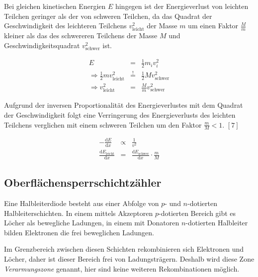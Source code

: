 \documentclass[12pt,a4paper]{scrartcl}
\numberwithin{equation}{section} %
\renewcommand{\[}{} %
\renewcommand{\]}{\noindent} %
\begin{document}
Bei gleichen kinetischen Energien \(E\) hingegen ist der Energieverlust
von leichten Teilchen geringer als der von schweren Teilchen, da das
Quadrat der Geschwindigkeit des leichteren Teilchens
\(v_\mathrm{leicht}^2\) der Masse \(m\) um einen Faktor \(\frac{M}{m}\)
kleiner als das des schwereren Teilchens der Masse \(M\) und
Geschwindigkeitsquadrat \(v_\mathrm{schwer}^2\) ist.

\[
\begin{eqnarray}
    E &=& \frac{1}{2}m_i v_i^2 \\
    \Rightarrow \frac{1}{2} m v_\mathrm{leicht}^2
        &\overset{!}{=}& \frac{1}{2} M v_\mathrm{schwer}^2 \\
    \Rightarrow v_\mathrm{leicht}^2 & = &\frac{M}{m} v_\mathrm{schwer}^2
\end{eqnarray}
\]

Aufgrund der inversen Proportionalität des Energieverlustes mit dem
Quadrat der Geschwindigkeit folgt eine Verringerung des Energieverlusts
des leichten Teilchens verglichen mit einem schweren Teilchen um den
Faktor \(\frac{m}{M} < 1\). \([7]\)

\[
\begin{eqnarray}
    - \frac{\mathrm dE}{\mathrm dx} &\propto& \frac{1}{v^2} \\
    \frac{\mathrm dE_\mathrm{leicht}}{\mathrm dx}
        &=& \frac{\mathrm dE_\mathrm{schwer}}{\mathrm dx}
            \cdot \frac{m}{M}
\end{eqnarray}
\]

\hypertarget{oberfluxe4chensperrschichtzuxe4hler}{%
\subsection{Oberflächensperrschichtzähler}\label{oberfluxe4chensperrschichtzuxe4hler}}

Eine Halbleiterdiode besteht aus einer Abfolge von \(p\)- und
\(n\)-dotierten Halbleiterschichten. In einem mittels Akzeptoren
\(p\)-dotierten Bereich gibt es Löcher als bewegliche Ladungen, in einem
mit Donatoren \(n\)-dotierten Halbleiter bilden Elektronen die frei
beweglichen Ladungen.

Im Grenzbereich zwischen diesen Schichten rekombinieren sich Elektronen
und Löcher, daher ist dieser Bereich frei von Ladungsträgern. Deshalb
wird diese Zone \emph{Verarmungszone} genannt, hier sind keine weiteren
Rekombinationen möglich.
\end{document}
